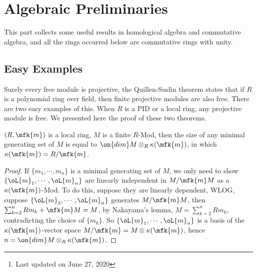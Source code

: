 
\newcommand{\mcal}[1]{\mathcal{#1}}
\title{}
\author{ by Cong Wen, 06/2020}
\date{}


\maketitle
\thispagestyle{empty}
\begin{abstract}
  This is my self-use notes\footnote{Last updated on June 27, 2020} on \cite{Quillen1976}, i.e., all the finite projective modules over polynomial rings are free. The proof is divided into two parts, the Hilbert-Serre theorem, which states that all the finite projective modules over polynomial rings are stably free, and the Quillen-Suslin theorem, all the stably free modules over polynomial rings are actually free.
\end{abstract}
\tableofcontents



\section{Algebraic Preliminaries}

This part collects some useful results in homological algebra and commutative algebra, and all the rings occurred below are commutative rings with unity.

\subsection{Easy Examples}
Surely every free module is projective, the Quillen-Suslin theorem states that if $R$ is a polynomial ring over field, then finite projective modules are also free. There are two easy examples of this. When $R$ is a PID or a local ring, any projective module is free. We presented here the proof of these two theorems.

\begin{lem}\label{lem:localfree}
	$(R,\mfk{m})$ is a local ring, $M$ is a finite $R$-Mod, then the size of any minimal generating set of $M$ is equal to $\on{dim}M\otimes_R\kappa(\mfk{m})$, in which $\kappa(\mfk{m})=R/\mfk{m}$.
\end{lem}
\begin{proof}
	If $\{m_1,\cdots, m_n\}$ is a minimal generating set of $M$, we only need to show $\{\oL{m}_1,\cdots,\oL{m}_n\}$ are linearly independent in $M/\mfk{m}M$ as a $\kappa(\mfk{m})$-Mod. To do this, suppose they are linearly dependent, WLOG, suppose $\{\oL{m}_2,\cdots,\oL{m}_n\}$ generates $M/\mfk{m}M$, then $\sum_{k=2}^nRm_k+\mfk{m}M=M$, by Nakayama's lemma, $M=\sum_{k=2}^nRm_k$, contradicting the choice of $\{m_k\}$. So $\{\oL{m}_1,\cdots,\oL{m}_n\}$ is a basis of the $\kappa(\mfk{m})$-vector space $M/\mfk{m}=M\otimes\kappa(\mfk{m})$, hence $n=\on{dim}M\otimes_R\kappa(\mfk{m})$.
\end{proof}

